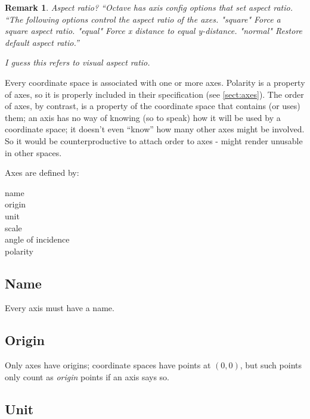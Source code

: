\documentclass[reqno,12pt]{tufte-handout}
\numberwithin{equation}{subsection}
\numberwithin{equation}{subsection}
\newtheorem{remark}{Remark}
\newcommand\cspace{coordinate space}
\begin{document}
  \begin{remark}
    Aspect ratio?  ``Octave has axis config options that set aspect
    ratio.  ``The following options control the aspect ratio of the
    axes.  "square" Force a square aspect ratio.  "equal" Force x
    distance to equal y-distance.  "normal" Restore default aspect
    ratio.''

    I guess this refers to visual aspect ratio.
  \end{remark}

  Every \cspace{} is associated with one or more axes.  Polarity is a
  property of axes, so it is properly included in their specification
  (see \ref{sect:axes}).  The order of axes, by contrast, is a
  property of the \cspace{} that contains (or uses) them; an axis has
  no way of knowing (so to speak) how it will be used by a \cspace; it
  doesn't even ``know'' how many other axes might be involved.  So it
  would be counterproductive to attach order to axes - might render
  unusable in other spaces.

  Axes are defined by:

  \begin{description}
  \item [name]
  \item [origin]
  \item [unit]
  \item [scale]
  \item [angle of incidence]
  \item [polarity]
  \end{description}

  \subsection{Name}
  \label{subs:axisname}

Every axis must have a name.

  \subsection{Origin}
  \label{subs:axisorigin}

  Only axes have origins; \cspace{}s have points at \((0,0)\), but such
  points only count as \textit{origin} points if an axis says so.

  \subsection{Unit}
  \label{subs:axisunit}
\end{document}
